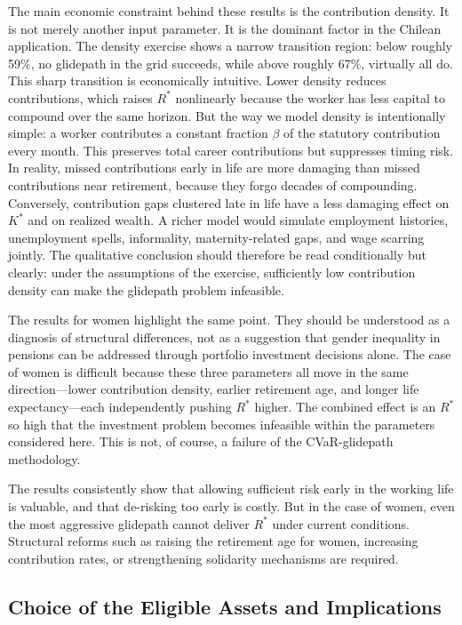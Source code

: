 \documentclass[11pt]{article}
\newcommand{\Rstar}{R^{*}}
\newcommand{\Kstar}{K^{*}}
\begin{document}
The main economic constraint behind these  results is the contribution density. It is not merely another input parameter. It is the dominant factor in the Chilean application. The density exercise shows a narrow transition region: below roughly 59\%, no glidepath in the grid succeeds, while above roughly 67\%, virtually all do. This sharp transition is economically intuitive. Lower density reduces contributions, which raises $\Rstar$ nonlinearly because the worker has less capital to compound over the same horizon. But the way we model density is intentionally simple: a worker contributes a constant fraction $\beta$ of the statutory contribution every month. This preserves total career contributions but suppresses timing risk. In reality, missed contributions early in life are more damaging than missed contributions near retirement, because they forgo decades of compounding. Conversely, contribution gaps clustered late in life have a less damaging  effect on $\Kstar$ and on realized wealth. A richer model would simulate employment histories, unemployment spells, informality, maternity-related gaps, and wage scarring jointly. The qualitative conclusion should therefore be read conditionally but clearly: under the assumptions of the exercise, sufficiently low contribution density can make the glidepath problem infeasible.

The results for women highlight the same point. They should be understood as 
a diagnosis of structural differences, not as a suggestion that gender 
inequality in pensions can be addressed through portfolio investment decisions alone. 
The case of women is difficult because these three parameters all move in the 
same direction---lower contribution density, earlier retirement age, and 
longer life expectancy---each independently pushing $R^*$ higher. The 
combined effect is an $R^*$ so high that the investment problem becomes 
infeasible within the parameters  considered here. This is not, of course, a failure of the CVaR-glidepath methodology.

The results consistently show that allowing sufficient risk early in the 
working life is valuable, and that de-risking too early is costly. But in 
the case of women, even the most aggressive glidepath cannot deliver $R^*$ 
under current conditions.  Structural reforms such 
as raising the retirement age for women, increasing contribution rates, or 
strengthening solidarity mechanisms are required.

\subsection{Choice of the Eligible Assets and Implications}
\end{document}
